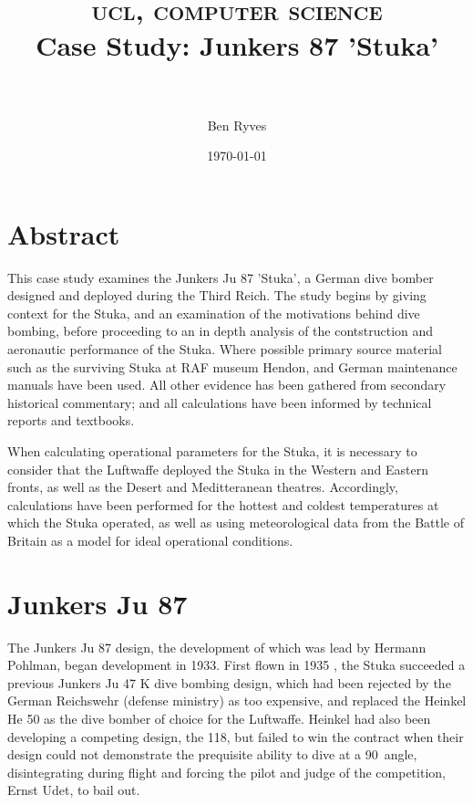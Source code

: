 \documentclass[a4paper, fontsize=11pt]{scrartcl} %
\title{
  \normalfont \normalsize
  \textsc{ucl, computer science}
  \horrule{0.5pt} \\[0.4cm]
  \huge{Case Study: Junkers 87 'Stuka'}\\
  \horrule{0.5pt} \\[0.5cm]
}
\author{Ben Ryves}
\date{\normalsize\today}
\begin{document}
\maketitle




\section{Abstract}
This case study examines the Junkers Ju 87 'Stuka', a German dive bomber
designed and deployed during the Third Reich. The study begins by giving
context for the Stuka, and an examination of the motivations behind dive
bombing, before proceeding to an in depth analysis of the contstruction
and aeronautic performance of the Stuka. Where possible primary source
material such as the surviving Stuka at RAF museum Hendon, and German
maintenance manuals have been used. All other evidence has been
gathered from secondary historical commentary; and all calculations have
been informed by technical reports and textbooks.

When calculating operational parameters for the Stuka, it is necessary
to consider that the Luftwaffe deployed the Stuka in the Western and
Eastern fronts, as well as the Desert and Meditteranean theatres.
Accordingly, calculations have been performed for the hottest and
coldest temperatures at which the Stuka operated, as well as using
meteorological data from the Battle of Britain as a model for ideal
operational conditions.
\section{Junkers Ju 87}

The Junkers Ju 87 design, the development of
which was lead by Hermann Pohlman, began development in 1933. First flown
in 1935 \autocite[p.~9]{weal97}, the Stuka succeeded a previous
Junkers Ju 47 K dive bombing design, which had been rejected by the
German Reichswehr (defense ministry) as too expensive, and replaced the
Heinkel He 50 as the dive bomber of choice for the Luftwaffe. Heinkel
had also been developing a competing design, the 118, but failed to win the
contract when their design could not demonstrate the prequisite
ability to dive at a 90\textdegree\ angle, disintegrating during flight
\autocite[p.~68-69]{killen67} and forcing the pilot and judge of the
competition, Ernst Udet, to bail out.
\end{document}
